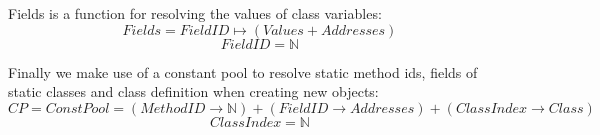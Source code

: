 Fields is a function for resolving the values of class variables:
$$Fields = FieldID \mapsto (Values + Addresses)$$ 
$$FieldID = \mathbb{N}$$

Finally we make use of a constant pool to resolve static method ids, fields of static classes and class definition when creating new objects:
$$CP = ConstPool = (MethodID \to \mathbb{N}) + (FieldID \to Addresses) + (ClassIndex \to  Class)$$
$$ClassIndex = \mathbb{N}$$

